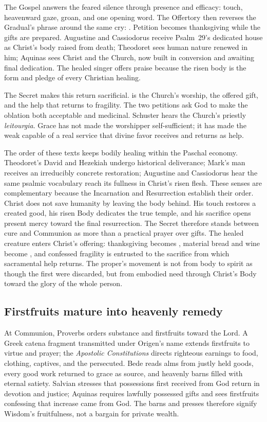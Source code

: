 The Gospel answers the feared silence through presence and efficacy: touch,
heavenward gaze, groan, and one opening word. The Offertory then reverses the
Gradual's phrase around the same cry: . Petition becomes thanksgiving while the gifts are prepared. Augustine
and Cassiodorus receive Psalm~29's dedicated house as Christ's body raised from
death; Theodoret sees human nature renewed in him; Aquinas sees Christ and the
Church, now built in conversion and awaiting final dedication. The healed
singer offers praise because the risen body is the form and pledge of every
Christian healing.

The Secret makes this return sacrificial.  is the Church's
worship,  the offered gift, and  the help that
returns to fragility. The two petitions  ask God to make the oblation
both acceptable and medicinal. Schuster hears the Church's priestly
\emph{leitourgia}. Grace has not made the worshipper self-sufficient; it has
made the weak capable of a real service that divine favor receives and returns
as help.

The order of these texts keeps bodily healing within the Paschal economy.
Theodoret's David and Hezekiah undergo historical deliverance; Mark's man
receives an irreducibly concrete restoration; Augustine and Cassiodorus hear
the same psalmic vocabulary reach its fullness in Christ's risen flesh. These
senses are complementary because the Incarnation and Resurrection establish
their order. Christ does not save humanity by leaving the body behind. His
touch restores a created good, his risen Body dedicates the true temple, and
his sacrifice opens present mercy toward the final resurrection. The Secret
therefore stands between cure and Communion as more than a practical prayer
over gifts. The healed creature enters Christ's offering: thanksgiving becomes
, material bread and wine become , and confessed
fragility is entrusted to the sacrifice from which sacramental help returns.
The proper's movement is not from body to spirit as though the first were
discarded, but from embodied need through Christ's Body toward the glory of
the whole person.

\subsection*{Firstfruits mature into heavenly remedy}

At Communion, Proverbs orders substance and firstfruits toward the Lord. A
Greek catena fragment transmitted under Origen's name extends firstfruits to
virtue and prayer; the \emph{Apostolic Constitutions} directs righteous
earnings to food, clothing, captives, and the persecuted. Bede reads alms from
justly held goods, every good work returned to grace as source, and heavenly
barns filled with eternal satiety. Salvian stresses that possessions first
received from God return in devotion and justice; Aquinas requires lawfully
possessed gifts and sees firstfruits confessing that increase came from God.
The barns and presses therefore signify Wisdom's fruitfulness, not a bargain
for private wealth.

